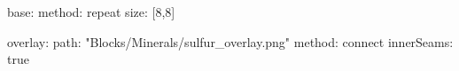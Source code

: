 base:
  method: repeat
  size: [8,8]

overlay:
  path: "Blocks/Minerals/sulfur_overlay.png"
  method: connect
  innerSeams: true